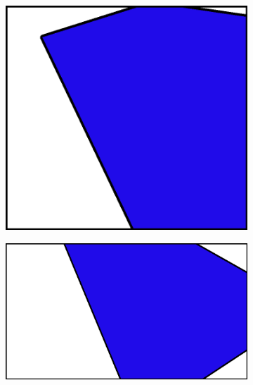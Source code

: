 \documentclass[10pt]{oblivoir}
\begin{document}
\begin{figure}
\begin{subfigure}{3.5cm}
        \caption{}
        \label{fig;table-partial-1}
    \end{subfigure}
    \begin{subfigure}{3.5cm}
        \includegraphics[width=\textwidth]{img/table-partial-view-filter-3.png}
        \caption{}
        \label{fig;table-partial-3}
    \end{subfigure}
    \begin{subfigure}{3.5cm}
        \includegraphics[width=\textwidth]{img/table-partial-view-filter-4.png}
        \caption{}
        \label{fig;table-partial-4}
    \end{subfigure}
    \begin{subfigure}{3.5cm}

\end{subfigure}
\end{figure}
\end{document}

